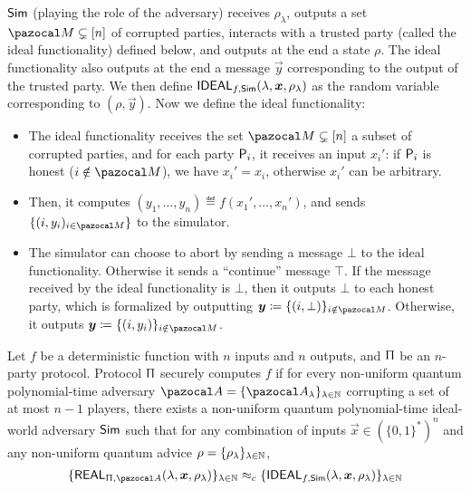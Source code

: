 {  \begin{definition}
    $\Sim$ (playing the role of the adversary) receives $\rho_\lambda$, outputs a set $\cM \subsetneq [n]$ of corrupted parties, interacts with a trusted party (called the ideal functionality) defined below, and outputs at the end a state $\rho$. The ideal functionality also outputs at the end a message $\vec{y}$ corresponding to the output of the trusted party. We then define $\Ideal_{f,\Sim}(\lambda,\vec{x},\rho_\lambda)$ as the random variable corresponding to $(\rho, \vec{y})$. Now we define the ideal functionality:
    \begin{itemize}
      \item The ideal functionality receives the set $\cM \subsetneq [n]$ a subset of corrupted parties, and for each party $\P{}_i$, it receives an input $x_i'$: if $\P{}_i$ is honest ($i \notin \cM$), we have $x_i'=x_i$, otherwise $x_i'$ can be arbitrary.
      \item Then, it computes $(y_1,\dots,y_n) \eqdef f(x_1',\dots,x_n')$, and sends $\{(i,y_i)_{i \in \cM}\}$ to the simulator.
      \item The simulator can choose to abort by sending a message $\bot$ to the ideal functionality. Otherwise it sends a ``continue'' message $\top$. If the message received by the ideal functionality is $\bot$, then it outputs $\bot$ to each honest party, which is formalized by outputting $\vec{y} \eqdef \{(i,\bot)\}_{i \notin \cM}$. Otherwise, it outputs $\vec{y} \eqdef \{(i, y_i)\}_{i \notin \cM}$.
    \end{itemize}
  \end{definition}

  \begin{definition}\label{def:MPC}
    Let $f$ be a deterministic function with $n$ inputs and $n$ outputs, and $\Uppi$ be an $n$-party protocol. Protocol $\Uppi$ securely computes $f$ if for every non-uniform quantum polynomial-time adversary $\cA = \{\cA_\lambda\}_{\lambda \in \N}$ corrupting a set of at most $n-1$ players, there exists a non-uniform quantum polynomial-time ideal-world adversary $\Sim$ such that for any combination of inputs $\vec{x} \in (\{0,1\}^*)^n$ and any non-uniform quantum advice $\rho = \{\rho_\lambda\}_{\lambda \in \N}$,
    \begin{align}
      \{\Real_{\Uppi,\cA}(\lambda,\vec{x},\rho_\lambda)\}_{\lambda \in \N}
      \approx_c \{ \Ideal_{f,\Sim}(\lambda,\vec{x},\rho_\lambda) \}_{\lambda \in \N}
    \end{align}
  \end{definition}
}

